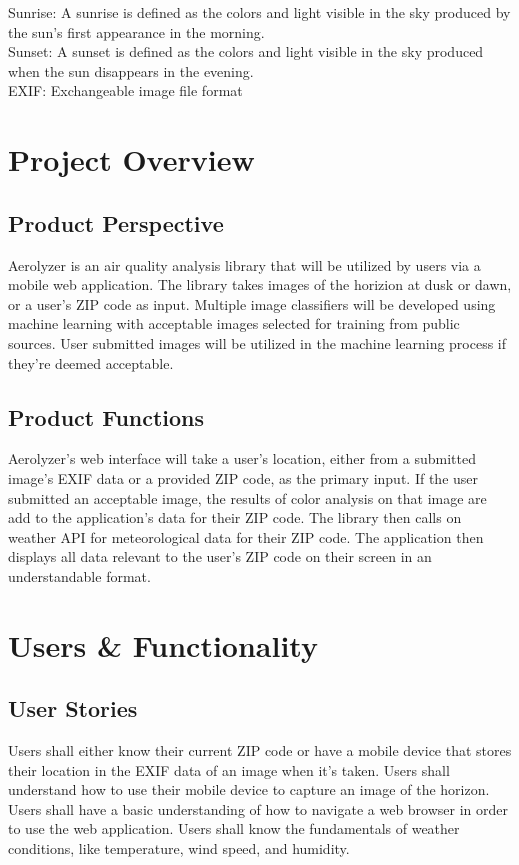 \documentclass[journal,10pt,draftclsnofoot,onecolumn]{IEEEtran}
\begin{document}
\begin{singlespace}
Sunrise: A sunrise is defined as the colors and light visible in the sky produced by the sun's first appearance in the morning.\\

Sunset: A sunset is defined as the colors and light visible in the sky produced when the sun disappears in the evening.\\

EXIF: Exchangeable image file format \\

\section{Project Overview}

\subsection{Product Perspective}
Aerolyzer is an air quality analysis library that will be utilized by users via a mobile web application.
The library takes images of the horizion at dusk or dawn, or a user’s ZIP code as input.
Multiple image classifiers will be developed using machine learning with acceptable images selected for training from public sources.
User submitted images will be utilized in the machine learning process if they’re deemed acceptable. 

\subsection{Product Functions}
Aerolyzer’s web interface will take a user’s location, either from a submitted image’s EXIF data or a provided ZIP code, as the primary input.
If the user submitted an acceptable image, the results of color analysis on that image are add to the application’s data for their ZIP code.
The library then calls on weather API for meteorological data for their ZIP code.
The application then displays all data relevant to the user’s ZIP code on their screen in an understandable format.

\section{Users \& Functionality}
\subsection{User Stories}
Users shall either know their current ZIP code or have a mobile device that stores their location in the EXIF data of an image when it’s taken.
Users shall understand how to use their mobile device to capture an image of the horizon.
Users shall have a basic understanding of how to navigate a web browser in order to use the web application.
Users shall know the fundamentals of weather conditions, like temperature, wind speed, and humidity.


\end{singlespace}
\end{document}
